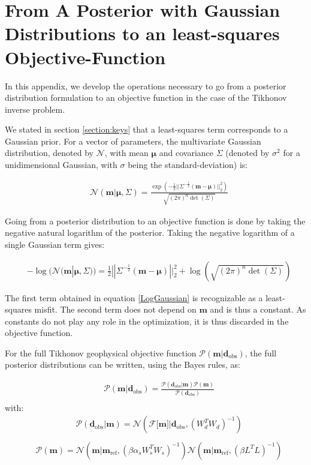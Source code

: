 \section{From A Posterior with Gaussian Distributions to an least-squares Objective-Function}
\label{appendix:PDtoL2}

In this appendix, we develop the operations necessary to go from a posterior distribution formulation to an objective function in the case of the Tikhonov inverse problem.

We stated in section \ref{section:keys} that a least-squares term corresponds to a Gaussian prior. For a vector of parameters, the multivariate Gaussian distribution, denoted by $\mathcal{N}$, with mean $\mathbf{\mu}$ and covariance $\Sigma$ (denoted by $\sigma^2$ for a unidimensional Gaussian, with $\sigma$ being the standard-deviation) is:

\begin{align}
&\mathcal{N}(\mathbf{m}|\mathbf{\mu}, \Sigma) = {\frac{\exp(-\frac{1}{2}||\Sigma^{-\frac{1}{2}}(\mathbf{m}-\mathbf{\mu})||_2^2)}{\sqrt{(2\pi)^n\det(\Sigma)}}} \label{GaussianDef_2}
\end{align}

Going from a posterior distribution to an objective function is done by taking the negative natural logarithm of the posterior. Taking the negative logarithm of a single Gaussian term gives:

\begin{align}
&-\log(\mathcal{N}(\mathbf{m}|\mathbf{\mu}, \Sigma)) = \frac{1}{2}||\Sigma^{-\frac{1}{2}}(\mathbf{m}-\mathbf{\mu})||_2^2 + \log({\sqrt{(2\pi)^n\det(\Sigma)}}) \label{LogGaussian}
\end{align}

The first term obtained in equation \ref{LogGaussian} is recognizable as a least-squares misfit. The second term does not depend on $\mathbf{m}$ and is thus a constant. As constants do not play any role in the optimization, it is thus discarded in the objective function.

For the full Tikhonov geophysical objective function $\mathcal{P}(\mathbf{m}|\mathbf{d}_{\text{obs}})$, the full posterior distributions can be written, using the Bayes rules, as:

\begin{align}
&\mathcal{P}(\mathbf{m}|\mathbf{d}_{\text{obs}}) = \frac{\mathcal{P}(\mathbf{d}_{\text{obs}}|\mathbf{m})\mathcal{P}(\mathbf{m})}{\mathcal{P}(\mathbf{d}_{\text{obs}})} \label{appendix:Bayes}\\
\end{align}
with: 
\begin{align}
&\mathcal{P}(\mathbf{d}_{\text{obs}}|\mathbf{m}) = \mathcal{N}(\mathcal{F}\lbrack\mathbf{m}\rbrack|\mathbf{d}_{\text{obs}}, (W_d^TW_d)^{-1}) \\
\end{align}
\begin{align}
&\mathcal{P}(\mathbf{m}) = \mathcal{N}(\mathbf{m}|\mathbf{m}_{{\text{ref}}}, (\beta\alpha_sW_s^TW_s)^{-1})\mathcal{N}(\mathbf{m}|\mathbf{m}_{{\text{ref}}},(\beta L^TL)^{-1})
\end{align}

